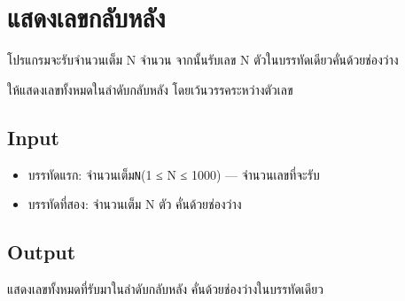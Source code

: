 \documentclass{article}
\begin{document}
\section*{แสดงเลขกลับหลัง}

โปรแกรมจะรับจำนวนเต็ม N จำนวน จากนั้นรับเลข N ตัวในบรรทัดเดียวคั่นด้วยช่องว่าง



ให้แสดงเลขทั้งหมดในลำดับกลับหลัง โดยเว้นวรรคระหว่างตัวเลข



\subsection*{Input}
\begin{itemize}

\item

  บรรทัดแรก: จำนวนเต็ม\texttt{N}(1 ≤ N ≤ 1000) --- จำนวนเลขที่จะรับ

\item

  บรรทัดที่สอง: จำนวนเต็ม N ตัว คั่นด้วยช่องว่าง

\end{itemize}



\subsection*{Output}
แสดงเลขทั้งหมดที่รับมาในลำดับกลับหลัง คั่นด้วยช่องว่างในบรรทัดเดียว\\
\end{document}
